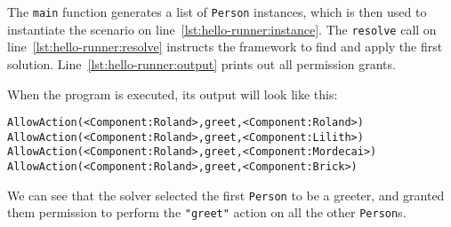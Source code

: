 The \lstinline{main} function generates a list of \lstinline{Person} instances, which is
then used to instantiate the scenario on line~\ref{lst:hello-runner:instance}. The
\lstinline{resolve} call on line~\ref{lst:hello-runner:resolve} instructs the framework
to find and apply the first solution. Line~\ref{lst:hello-runner:output} prints out all
permission grants.

When the program is executed, its output will look like this:

\begin{lstlisting}[style=output]
AllowAction(<Component:Roland>,greet,<Component:Roland>)
AllowAction(<Component:Roland>,greet,<Component:Lilith>)
AllowAction(<Component:Roland>,greet,<Component:Mordecai>)
AllowAction(<Component:Roland>,greet,<Component:Brick>)
\end{lstlisting}

We can see that the solver selected the first \lstinline{Person} to be a greeter,
and granted them permission to perform the \lstinline{"greet"} action on all the other
\lstinline{Person}s.
